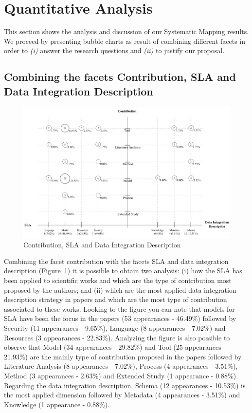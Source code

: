 \section{Quantitative Analysis}\label{sec:qanalysis}

This section shows the analysis and discussion of our Systematic Mapping results.
We proceed by presenting bubble charts as result of combining different facets in order to 
\textit{(i)} answer the research questions and \textit{(ii)} to justify our proposal.


\subsection{Combining the facets Contribution, SLA and Data Integration Description}

\begin{figure}[h!]
\centering
\includegraphics[scale=0.56]{figs/bubble-charts/Contribution-SLA-DIdescription.pdf} 
\caption{Contribution, SLA and Data Integration Description}\label{fig:facet1}
\end{figure}

Combining the facet contribution with the facets SLA and data integration description 
(Figure~\ref{fig:facet1}) it is possible to obtain two analysis: 
(i) how the SLA has been applied to scientific works and which are the type of contribution 
most proposed by the authors; and (ii) which are the most applied data integration description
strategy in papers and which are the most type of contribution associated to these works. 
Looking to the figure you can note that models for SLA have been the focus in the papers 
(53 appearances - 46.49\%) followed by Security (11 appearances - 9.65\%), Language 
(8 appearances - 7.02\%) and Resources (3 appearances - 22.83\%).
Analyzing the figure is also possible to observe that Model (34 appearances - 29.82\%) and 
Tool (25 appearances - 21.93\%) are the mainly type of contribution proposed in the papers 
followed by Literature Analysis (8 appearances - 7.02\%), Process (4 appearances - 3.51\%), 
Method (3 appearances - 2.63\%) and Extended Study (1 appearance - 0.88\%).
Regarding the data integration description, Schema (12 appearances - 10.53\%) is the most 
applied dimension followed by Metadata (4 appearances - 3.51\%) and Knowledge (1 appearance - 0.88\%).

